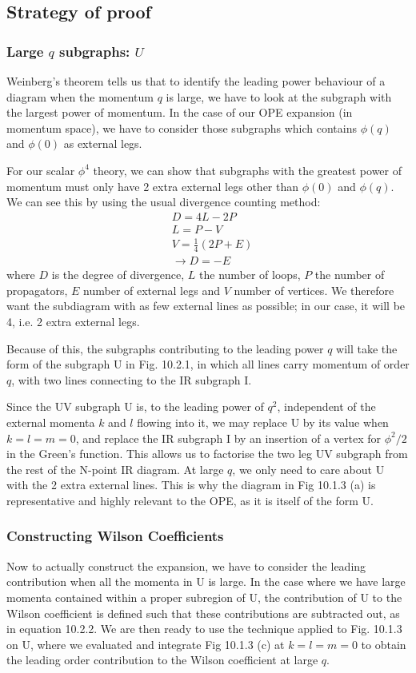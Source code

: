 \documentclass{article}
\begin{document}
\subsection{Strategy of proof}
\subsubsection{Large $q$ subgraphs: $U$}
Weinberg's theorem tells us that to identify the leading power behaviour of a diagram when the momentum $q$ is large, we have to look at the subgraph with the largest power of momentum. In the case of our OPE expansion (in momentum space), we have to consider those subgraphs which contains $\phi(q)$ and $\phi(0)$ as external legs. 

For our scalar $\phi^4$ theory, we can show that subgraphs with the greatest power of momentum must only have 2 extra external legs other than $\phi(0)$ and $\phi(q)$. We can see this by using the usual divergence counting method:
\begin{equation}
\begin{split}
    &D=4L-2P\\
    &L=P-V\\
    &V=\frac{1}{4}(2P+E)\\
    &\rightarrow D=-E
\end{split}
\end{equation}
where $D$ is the degree of divergence, $L$ the number of loops, $P$ the number of propagators, $E$ number of external legs and $V$ number of vertices. We therefore want the subdiagram with as few external lines as possible; in our case, it will be 4, i.e. 2 extra external legs. 

Because of this, the subgraphs contributing to the leading power $q$ will take the form of the subgraph U in Fig. 10.2.1, in which all lines carry momentum of order $q$, with two lines connecting to the IR subgraph I. 

Since the UV subgraph U is, to the leading power of $q^2$, independent of the external momenta $k$ and $l$ flowing into it, we may replace U by its value when $k=l=m=0$, and replace the IR subgraph I by an insertion of a vertex for $\phi^2/2$ in the Green's function. This allows us to factorise the two leg UV subgraph from the rest of the N-point IR diagram. At large $q$, we only need to care about U with the 2 extra external lines. This is why the diagram in Fig 10.1.3 (a) is representative and highly relevant to the OPE, as it is itself of the form U.

\subsubsection{Constructing Wilson Coefficients}
Now to actually construct the expansion, we have to consider the leading contribution when all the momenta in U is large. In the case where we have large momenta contained within a proper subregion of U, the contribution of U to the Wilson coefficient is defined such that these contributions are subtracted out, as in equation 10.2.2. We are then ready to use the technique applied to Fig. 10.1.3 on U, where we evaluated and integrate Fig 10.1.3 (c) at $k=l=m=0$ to obtain the leading order contribution to the Wilson coefficient at large $q$. 
\end{document}
